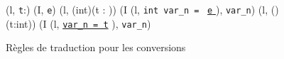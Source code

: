 \begin{figure*}[h!]
  \scriptsize{
    {
      {(l, \mbox{\lstinline't'}:) 
        (I, \mbox{\lstinline'e'})}
      {
        (l, (int)(t : )) 
        (I \concat (l,
        \mbox{\lstinline'int var_n ='}~
        \underline{\mbox{\lstinline'e'} \Zclear}
        \semicolon
        ), \mbox{\lstinline'var_n'})
      }{}
    }
    {
      {}
      {(l, ()(t:int))  (I \concat (l,
        \underline{\Zinit \mbox{\lstinline'var_n = t'}}
        \semicolon
        ), \mbox{\lstinline'var_n'})}{}
    }
  }
  \caption{Règles de traduction pour les conversions}
  \label{fig:coerce}
\end{figure*}
